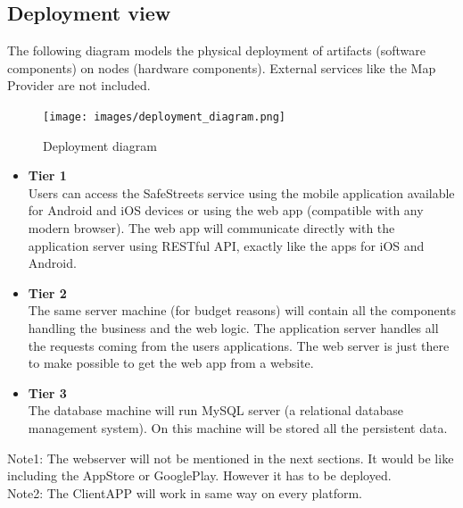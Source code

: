 \documentclass{article}
\begin{document}
\newpage

\subsection{Deployment view}
\label{sec:Deployment}
The following diagram models the physical deployment of artifacts (software components) on nodes (hardware components).
External services like the Map Provider are not included.
\begin{figure}[!htb]
\centering
	\texttt{[image: images/deployment\_diagram.png]}
	\caption{Deployment diagram}
	\label{fig:deployment-diagram}
\end{figure}

	
\begin{itemize}
	\item \textbf{Tier 1} \\
		Users can access the SafeStreets service using the mobile application available for Android and iOS devices or using the web app (compatible with any modern browser).
		The web app will communicate directly with the application server using RESTful API,
		exactly like the apps for iOS and Android.
	\item \textbf{Tier 2} \\ 
		The same server machine (for budget reasons)  will contain all the components handling the business and the web logic.
		The application server handles all the requests coming from the users applications. 
		The web server is just there to make possible to get the web app from a website. 
	\item \textbf{Tier 3} \\
		The database machine will run MySQL server (a relational database management system). On this machine will be stored all the persistent data.
\end{itemize}
		\small Note1: The webserver will not be mentioned in the next sections. It would be like including the AppStore or GooglePlay. However it has to be deployed.\\
		\small Note2: The ClientAPP will work in same way on every platform.

\newpage
\end{document}
